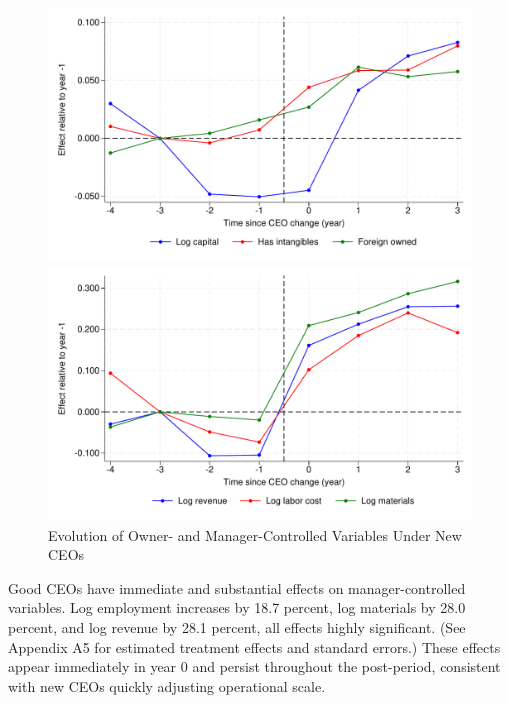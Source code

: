 \documentclass[11pt,a4paper]{article}
\begin{document}
\begin{figure}[htbp]
\centering
\begin{minipage}{0.45\textwidth}
\includegraphics[width=\textwidth]{figure/event_study_owner_controlled.pdf}
\end{minipage}
\begin{minipage}{0.45\textwidth}
\includegraphics[width=\textwidth]{figure/event_study_manager_controlled.pdf}
\end{minipage}
\label{fig:owner_manager_control}
\caption{Evolution of Owner- and Manager-Controlled Variables Under New CEOs}
\end{figure}



Good CEOs have immediate and substantial effects on manager-controlled variables. Log employment increases by 18.7 percent, log materials by 28.0 percent, and log revenue by 28.1 percent, all effects highly significant. (See Appendix A5 for estimated treatment effects and standard errors.) These effects appear immediately in year 0 and persist throughout the post-period, consistent with new CEOs quickly adjusting operational scale.
\end{document}
